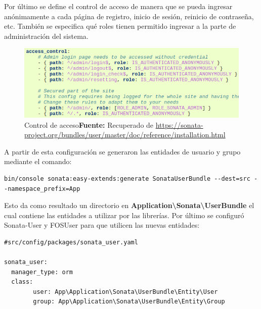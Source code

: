 \newpage
Por último se define el control de acceso de manera que se pueda ingresar anónimamente a cada página de registro, inicio de sesión, reinicio de contraseña,
etc.
También se especifica qué roles tienen permitido ingresar a la parte de administración del sistema.

\begin{figure}[h]
    \includegraphics[width=1\linewidth]{image/acl.png}
    \caption{Control de acceso\newline \textbf{Fuente:} Recuperado de \url{https://sonata-project.org/bundles/user/master/doc/reference/installation.html}}
    \label{fig:image/acl}
\end{figure}


A partir de esta configuración se generaron las entidades de usuario y grupo mediante el comando:

\begin{lstlisting}
bin/console sonata:easy-extends:generate SonataUserBundle --dest=src --namespace_prefix=App
\end{lstlisting}


Esto da como resultado un directorio en \textbf{Application\textbackslash Sonata\textbackslash UserBundle} el cual contiene las entidades a utilizar por las librerías.
Por último se configuró Sonata-User y FOSUser para que utilicen las nuevas entidades:

\begin{lstlisting}[caption={Archivo de configuración de Sonata-User.\\Fuente: \sonatainstallation}]
#src/config/packages/sonata_user.yaml

sonata_user:
  manager_type: orm
  class:
        user: App\Application\Sonata\UserBundle\Entity\User
        group: App\Application\Sonata\UserBundle\Entity\Group

\end{lstlisting}

